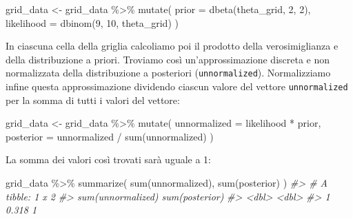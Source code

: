 \documentclass[
  11pt,
]{krantz}
\makeatletter
\newenvironment{Shaded}{\begin{snugshade}}{\end{snugshade}}
\newcommand{\AttributeTok}[1]{\textcolor[rgb]{0.61,0.61,0.61}{#1}}
\newcommand{\CommentTok}[1]{\textcolor[rgb]{0.37,0.37,0.37}{\textit{#1}}}
\newcommand{\DecValTok}[1]{\textcolor[rgb]{0.06,0.06,0.06}{#1}}
\newcommand{\FunctionTok}[1]{\textcolor[rgb]{0,0,0}{#1}}
\newcommand{\NormalTok}[1]{#1}
\newcommand{\OtherTok}[1]{\textcolor[rgb]{0.37,0.37,0.37}{#1}}
\newcommand{\SpecialCharTok}[1]{\textcolor[rgb]{0,0,0}{#1}}
\newenvironment{kframe}{%
\medskip{}
\setlength{\fboxsep}{.8em}
 \def\at@end@of@kframe{}%
 \ifinner\ifhmode%
  \def\at@end@of@kframe{\end{minipage}}%
  \begin{minipage}{\columnwidth}%
 \fi\fi%
 \def\FrameCommand##1{\hskip\@totalleftmargin \hskip-\fboxsep
 \colorbox{shadecolor}{##1}\hskip-\fboxsep
     \hskip-\linewidth \hskip-\@totalleftmargin \hskip\columnwidth}%
 \MakeFramed {\advance\hsize-\width
   \@totalleftmargin\z@ \linewidth\hsize
   \@setminipage}}%
 {\par\unskip\endMakeFramed%
 \at@end@of@kframe}
\renewenvironment{Shaded}{\begin{kframe}}{\end{kframe}}
\theoremstyle{definition}
\theoremstyle{definition}
\theoremstyle{definition}
\theoremstyle{definition}
\theoremstyle{remark}
\makeatother
\begin{document}
\begin{Shaded}
\begin{Highlighting}[]
\NormalTok{grid\_data }\OtherTok{\textless{}{-}}\NormalTok{ grid\_data }\SpecialCharTok{\%\textgreater{}\%}
  \FunctionTok{mutate}\NormalTok{(}
    \AttributeTok{prior =} \FunctionTok{dbeta}\NormalTok{(theta\_grid, }\DecValTok{2}\NormalTok{, }\DecValTok{2}\NormalTok{),}
    \AttributeTok{likelihood =} \FunctionTok{dbinom}\NormalTok{(}\DecValTok{9}\NormalTok{, }\DecValTok{10}\NormalTok{, theta\_grid)}
\NormalTok{  )}
\end{Highlighting}
\end{Shaded}

In ciascuna cella della griglia calcoliamo poi il prodotto della verosimiglianza e della distribuzione a priori. Troviamo così un'approssimazione discreta e non normalizzata della distribuzione a posteriori (\texttt{unnormalized}). Normalizziamo infine questa approssimazione dividendo ciascun valore del vettore \texttt{unnormalized} per la somma di tutti i valori del vettore:

\begin{Shaded}
\begin{Highlighting}[]
\NormalTok{grid\_data }\OtherTok{\textless{}{-}}\NormalTok{ grid\_data }\SpecialCharTok{\%\textgreater{}\%}
  \FunctionTok{mutate}\NormalTok{(}
    \AttributeTok{unnormalized =}\NormalTok{ likelihood }\SpecialCharTok{*}\NormalTok{ prior,}
    \AttributeTok{posterior =}\NormalTok{ unnormalized }\SpecialCharTok{/} \FunctionTok{sum}\NormalTok{(unnormalized)}
\NormalTok{  )}
\end{Highlighting}
\end{Shaded}

La somma dei valori così trovati sarà uguale a 1:

\begin{Shaded}
\begin{Highlighting}[]
\NormalTok{grid\_data }\SpecialCharTok{\%\textgreater{}\%}
  \FunctionTok{summarize}\NormalTok{(}
    \FunctionTok{sum}\NormalTok{(unnormalized),}
    \FunctionTok{sum}\NormalTok{(posterior)}
\NormalTok{  )}
\CommentTok{\#\textgreater{} \# A tibble: 1 x 2}
\CommentTok{\#\textgreater{}   \textasciigrave{}sum(unnormalized)\textasciigrave{} \textasciigrave{}sum(posterior)\textasciigrave{}}
\CommentTok{\#\textgreater{}                 \textless{}dbl\textgreater{}            \textless{}dbl\textgreater{}}
\CommentTok{\#\textgreater{} 1               0.318                1}
\end{Highlighting}
\end{Shaded}
\end{document}
